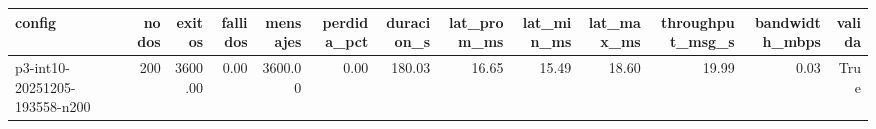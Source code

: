 \begin{tabular}{lrrrrrrrrrrrr}
\toprule
config & nodos & exitos & fallidos & mensajes & perdida_pct & duracion_s & lat_prom_ms & lat_min_ms & lat_max_ms & throughput_msg_s & bandwidth_mbps & valida \\
\midrule
p3-int10-20251205-193558-n200 & 200 & 3600.00 & 0.00 & 3600.00 & 0.00 & 180.03 & 16.65 & 15.49 & 18.60 & 19.99 & 0.03 & True \\
\bottomrule
\end{tabular}
